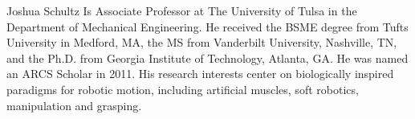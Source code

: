\documentclass[journal]{IEEEtran}
\begin{document}
\vspace{11pt}

\begin{IEEEbiography}{Joshua Schultz}
Is Associate Professor at The University of Tulsa in the Department of Mechanical Engineering. He received the BSME degree from Tufts University in Medford, MA, the MS from Vanderbilt University, Nashville, TN, and the Ph.D. from Georgia Institute of Technology, Atlanta, GA. He was named an ARCS Scholar in 2011. His research interests center on biologically inspired paradigms for robotic motion, including artificial muscles, soft robotics, manipulation and grasping.
\end{IEEEbiography}

\vfill

\newpage

\listoffigures
\end{document}
